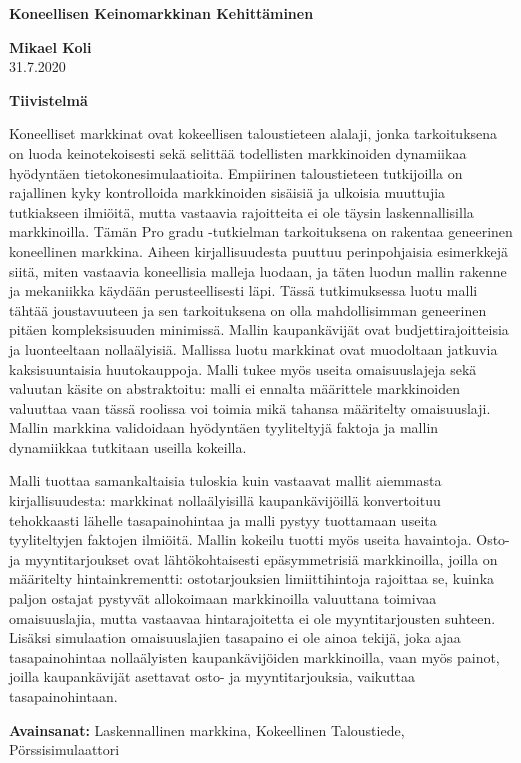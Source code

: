

\thispagestyle{plain}
\begin{center}
    \Large
    \textbf{Koneellisen Keinomarkkinan Kehitt\"aminen}
        
    \vspace{0.4cm}
    \large
        
    \vspace{0.4cm}
    \textbf{Mikael Koli}\\
    31.7.2020 %
       
    \vspace{0.9cm}
    \textbf{Tiivistelmä}
\end{center}

Koneelliset markkinat ovat kokeellisen taloustieteen alalaji, jonka tarkoituksena
on luoda keinotekoisesti sekä selittää todellisten markkinoiden dynamiikaa hyödyntäen
tietokonesimulaatioita. Empiirinen taloustieteen tutkijoilla on rajallinen kyky kontrolloida
markkinoiden sisäisiä ja ulkoisia muuttujia tutkiakseen ilmiöitä, mutta vastaavia rajoitteita
ei ole täysin laskennallisilla markkinoilla. Tämän Pro gradu -tutkielman tarkoituksena on rakentaa
geneerinen koneellinen markkina. Aiheen kirjallisuudesta puuttuu perinpohjaisia esimerkkejä siitä,
miten vastaavia koneellisia malleja luodaan, ja täten luodun mallin rakenne ja mekaniikka käydään
perusteellisesti läpi. Tässä tutkimuksessa luotu malli tähtää joustavuuteen ja sen tarkoituksena on
olla mahdollisimman geneerinen pitäen kompleksisuuden minimissä. Mallin kaupankävijät ovat budjettirajoitteisia
ja luonteeltaan nollaälyisiä. Mallissa luotu markkinat ovat muodoltaan jatkuvia
kaksisuuntaisia huutokauppoja. Malli tukee myös useita omaisuuslajeja sekä valuutan käsite on abstraktoitu: 
malli ei ennalta määrittele markkinoiden valuuttaa vaan tässä roolissa voi toimia mikä tahansa määritelty
omaisuuslaji. Mallin markkina validoidaan hyödyntäen tyyliteltyjä faktoja ja mallin dynamiikkaa
tutkitaan useilla kokeilla.

Malli tuottaa samankaltaisia tuloskia kuin vastaavat mallit aiemmasta kirjallisuudesta: markkinat nollaälyisillä
kaupankävijöillä konvertoituu tehokkaasti lähelle tasapainohintaa ja malli pystyy tuottamaan useita tyyliteltyjen 
faktojen ilmiöitä. Mallin kokeilu tuotti myös useita havaintoja. Osto- ja myyntitarjoukset ovat lähtökohtaisesti 
epäsymmetrisiä markkinoilla, joilla on määritelty hintainkrementti: ostotarjouksien limiittihintoja rajoittaa 
se, kuinka paljon ostajat pystyvät allokoimaan markkinoilla valuuttana toimivaa omaisuuslajia, mutta vastaavaa 
hintarajoitetta ei ole myyntitarjousten suhteen. Lisäksi simulaation omaisuuslajien tasapaino ei ole ainoa tekijä,
joka ajaa tasapainohintaa nollaälyisten kaupankävijöiden markkinoilla, vaan myös painot, joilla kaupankävijät 
asettavat osto- ja myyntitarjouksia, vaikuttaa tasapainohintaan.

\textbf{Avainsanat:} Laskennallinen markkina, Kokeellinen Taloustiede, Pörssisimulaattori